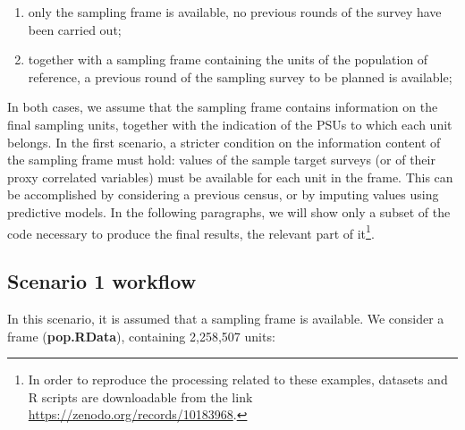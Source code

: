 \begin{enumerate}
	\item only the sampling frame is available, no previous rounds of the survey have been carried out;
	\item together with a sampling frame containing the units of the population of reference, a previous round of the sampling survey to be planned is available;
\end{enumerate}

In both cases, we assume that the sampling frame contains information on the final sampling units, together with the indication of the PSUs to which each unit belongs.
In the first scenario, a stricter condition on the information content of the sampling frame must hold: values of the sample target surveys (or of their proxy correlated variables) must be available for each unit in the frame. This can be accomplished by considering a previous census, or by imputing values using predictive models. 
In the following paragraphs, we will show only a subset of the code necessary to produce the final results, the relevant part of it\footnote{In order to reproduce the processing related to these examples, datasets and R scripts are downloadable from the link  \href{https://zenodo.org/records/10183968}{https://zenodo.org/records/10183968}.}.

\subsection{Scenario 1 workflow}

In this scenario, it is assumed that a sampling frame is available. We consider a frame (\textbf{pop.RData}), containing 2,258,507 units: 

